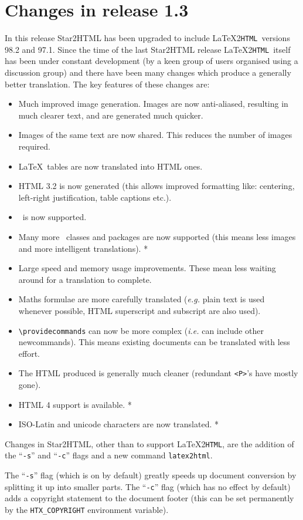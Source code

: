 \documentclass[twoside,11pt,nolof]{starlink}
\providecommand{\latextohtml}{\LaTeX2\texttt{HTML}}
\begin{document}
\section{\label{changes13}Changes in release 1.3}
In this release Star2HTML has been upgraded to include \latextohtml\
versions 98.2 and 97.1. Since the time of the last Star2HTML release
\latextohtml\ itself has been under constant development (by a keen
group of users organised using a discussion group) and there have been
many changes which produce a generally better translation. The key
features of these changes are:
\begin{itemize}
\item Much improved image generation. Images are now anti-aliased,
      resulting in much clearer text, and are generated much quicker.
\item Images of the same text are now shared. This reduces the number
      of images required.
\item \LaTeX\ tables are now translated into HTML ones.
\item HTML 3.2 is now generated (this allows improved formatting like:
      centering, left-right justification, table captions etc.).
\item \LaTeXe\ is now supported.
\item Many more \LaTeXe\ classes and packages are now supported (this
      means less images and more intelligent translations). *
\item Large speed and memory usage improvements. These mean
      less waiting around for a translation to complete.
\item Maths formulae are more carefully translated (\textit{e.g.}
      plain text is used whenever possible, HTML superscript and
      subscript are also used).
\item \verb#\providecommands# can now be more complex (\textit{i.e.} can
      include other newcommands). This means existing documents can be
      translated with less effort.
\item The HTML produced is generally much cleaner (redundant \verb#<P>#'s
      have mostly gone).
\item HTML 4 support is available. *
\item ISO-Latin and unicode characters are now translated. *
\end{itemize}

Changes in Star2HTML, other than to support \latextohtml, are the
addition of the ``\verb#-s#'' and ``\verb#-c#'' flags
and a new command \verb#latex2html#.

The ``\verb#-s#'' flag (which is on by default) greatly speeds up
document conversion by splitting it up into smaller parts.
The ``\verb#-c#'' flag (which has no effect by default) adds a
copyright statement to the document footer (this can be set
permanently by the \verb#HTX_COPYRIGHT# environment variable).
\end{document}
